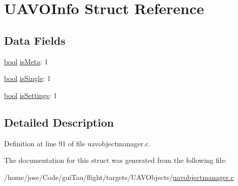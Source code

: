 \hypertarget{struct_u_a_v_o_info}{\section{U\-A\-V\-O\-Info Struct Reference}
\label{struct_u_a_v_o_info}
}
\subsection*{Data Fields}
\begin{DoxyCompactItemize}
\item 
\hyperlink{group___exported__types_gaf6a258d8f3ee5206d682d799316314b1}{bool} \hyperlink{group___u_a_v_ga6d180f678afa491a14a13dccf7a6916d}{is\-Meta}\-: 1
\item 
\hyperlink{group___exported__types_gaf6a258d8f3ee5206d682d799316314b1}{bool} \hyperlink{group___u_a_v_gac17e3b9e0eaf982bbbba5545026f7bb4}{is\-Single}\-: 1
\item 
\hyperlink{group___exported__types_gaf6a258d8f3ee5206d682d799316314b1}{bool} \hyperlink{group___u_a_v_ga18d192ef3b73129422653ea96a697711}{is\-Settings}\-: 1
\end{DoxyCompactItemize}


\subsection{Detailed Description}


Definition at line 91 of file uavobjectmanager.\-c.



The documentation for this struct was generated from the following file\-:\begin{DoxyCompactItemize}
\item 
/home/jose/\-Code/gui\-Tau/flight/targets/\-U\-A\-V\-Objects/\hyperlink{uavobjectmanager_8c}{uavobjectmanager.\-c}\end{DoxyCompactItemize}
